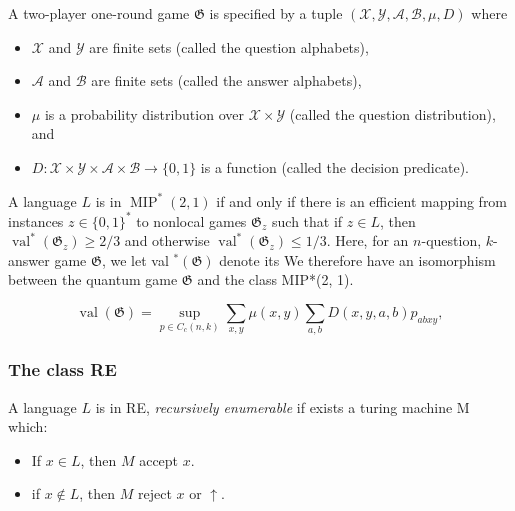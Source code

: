 \begin{defn} A two-player one-round game $\mathfrak{G}$ is specified by a tuple $(\mathcal{X}, \mathcal{Y}, \mathcal{A}, \mathcal{B}, \mu, D)$ where
    \begin{itemize}
        \item $\mathcal{X}$ and $\mathcal{Y}$ are finite sets (called the question alphabets),
        \item $\mathcal{A}$ and $\mathcal{B}$ are finite sets (called the answer alphabets),
        \item $\mu$ is a probability distribution over $\mathcal{X} \times \mathcal{Y}$ (called the question distribution), and
        \item $D: \mathcal{X} \times \mathcal{Y} \times \mathcal{A} \times \mathcal{B} \rightarrow\{0,1\}$ is a function (called the decision predicate).
    \end{itemize}
\end{defn}

A language $L$ is in $\operatorname{MIP}^{*}(2,1)$ if and only if there is an efficient mapping from instances $z \in\{0,1\}^{*}$ to nonlocal games $\mathfrak{G}_{z}$ such that if $z \in L$, then $\operatorname{val}^{*}\left(\mathfrak{G}_{z}\right) \geq 2 / 3$ and otherwise $\operatorname{val}^{*}\left(\mathfrak{G}_{z}\right) \leq 1 / 3$. Here, for an $n$-question, $k$-answer game $\mathfrak{G}$, we let val ${ }^{*}(\mathfrak{G})$ denote its
We therefore have an isomorphism between the quantum game $\mathfrak{G}$ and the class MIP*(2, 1).

\begin{defn}
    \begin{equation}
    \operatorname{val}(\mathfrak{G})=\sup _{p \in C_{c}(n, k)} \sum_{x, y} \mu(x, y) \sum_{a, b} D(x, y, a, b) p_{a b x y},
    \end{equation}
\end{defn}

\subsubsection{The class RE}

\begin{defn}
A language $L$ is in RE, \emph{recursively enumerable} if exists a turing machine M which:
\begin{itemize}
\item If $x \in L$, then $M$ accept $x$.
\item if $x \notin L$, then $M$ reject $x$ or $\uparrow$.
\end{itemize}
\end{defn}

